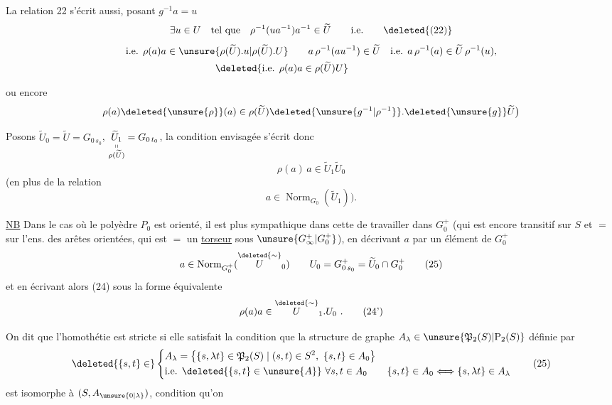 La relation 22 s'écrit aussi, posant $g^{-1}a=u$
\[
\exists u\in U\quad\text{tel que}\quad\rho^{-1}(ua^{-1})a^{-1}\in\widetilde U\qquad\text{i.e.}\tag*{\deleted{(22)}}
\]
\[
\begin{aligned}
&\text{i.e. }\rho(a)a\in\unsure{\rho(\widetilde U).u|{\rho(\widetilde U).U}} \qquad
a\,\rho^{-1}(au^{-1})\in\widetilde U\quad\text{i.e. }a\,\rho^{-1}(a)\in\widetilde U\,\rho^{-1}(u),\\
&\hspace{9em}\deleted{\text{i.e. }\rho(a)a\in\rho(\widetilde U)U}
\end{aligned}
\]

ou encore
\[
\rho(a)\deleted{\unsure{\rho}}(a)\in\rho(\widetilde U)\deleted{\unsure{g^{-1}|\rho^{-1}}}.\deleted{\unsure{g}}\widetilde U\bigr)
\]

Posons $\widetilde U_0=\widetilde U=G_{0\,s_0}$, $\underset{\substack{\shortparallel\\\rho(\widetilde U)}}{\widetilde U_1}=G_{0\,t_0}$, la condition envisagée s'écrit donc
\[
\rho(a)\,a\in\widetilde U_1\widetilde U_0\tag*{(24)}
\]
(en plus de la relation
\[
a\in\operatorname{Norm}_{G_0}(\widetilde U_1)\bigr).
\]

\uline{NB} Dans le cas où le polyèdre $P_0$ est orienté, il est plus sympathique dans cette  de travailler dans $G_0^+$ (qui est encore transitif sur $S$ et $=$ sur l'ens. des arêtes orientées, qui est $=$ un \uline{torseur} sous $\unsure{G_\infty^+|G_0^+}$), en décrivant $a$ par un élément de $G_0^+$
\[
a\in\operatorname{Norm}_{G_0^+}(\overset{\deleted{\sim}}{U}_0)\qquad U_0=G^+_{0\,s_0}=\widetilde U_0\cap G_0^+ \tag*{(25)}
\]
et en écrivant  alors (24)  sous la forme équivalente
\[
\rho(a)a\in\overset{\deleted{\sim}}{U}_1.U_0\ .\tag*{(24')}
\]

On dit que l'homothétie \inserted{$\lambda$} est stricte si elle satisfait la condition que la structure de graphe  $A_\lambda\in\unsure{\mathfrak P_2(S)|\mathrm P_2(S)}$ définie par
\[
\deleted{\{s,t\}\in}\left\{\begin{aligned}
&A_\lambda=\bigl\{\{s,\lambda t\}\in\mathfrak P_2(S)\mid(s,t)\in S^2,\ \{s,t\}\in A_0\bigr\}\\
&\text{i.e. }\deleted{\{s,t\}\in\unsure{A}}\ \forall s,t\in A_0\qquad
\{s,t\}\in A_0\Longleftrightarrow\{s,\lambda t\}\in A_\lambda
\end{aligned}\right.\tag*{(25)}
\]
est isomorphe à $(S,A_{\unsure{0|\lambda}})$,  condition qu'on

